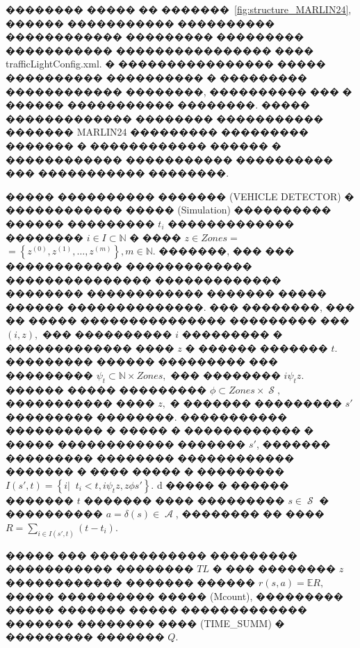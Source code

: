 \documentclass[11pt]{ubs}
\DeclareMathOperator{\state}{\mathcal{S}}
\DeclareMathOperator{\action}{\mathcal{A}}
\begin{document}
�������� ����� �� �������~\ref{fig:structure_MARLIN24}, ������ ����������� ���������� ������������ ��������� ��������� ����������� ���������������� ���� trafficLightConfig.xml. � ���������������� ����� ���������� ���������� � ��������� ������������ ��������, ���������� ��� � ������ ����������� ��������.
����� ������������� �������� ����������� ������� MARLIN24  ���������  ���������  ������� � ������������ ������  � ������������ ����������� ���������� ��� ����������� ��������.

����� ���������� ������� (VEHICLE DETECTOR) � ������������ ����� (Simulation)  ���������� ������ ��������� $t_i$ ������������� �������� $i \in I \subset \mathbb{N}$ � ���� $z\in Zones = $ $ = \left\{z^{(0)}, z^{(1)}, \dots, z^{(m)} \right\}, m \in \mathbb{N}$.
�������, ��� ��� ������������ �������������   ��������������� ������������� �������� ������������ ������� ����� ������ ��������������. ��� ��������, ��� �� ����� ��������������� ��������� ��� $(i,z),$ ���  ���������� $i$ ��������� � ������������� ���� $z$ � ������ ������� $t.$ ��������� ������ ��������� ��� ��������� $\psi_t \subset \mathbb{N} \times Zones, $ ��� ��������  $i\psi_t z.$
������ ����� ��������� $\phi \subset Zones \times \state,$ ����������� ���� $z, $ � ������� ��������� $s'$ ��������� ��������.
����������� ���������� �  ����� � ������������ � ����� ������������ ������� $s'$, ������� ��������� �������� ������������ ������� � ���� ����� � ���������
$
  I(s',t) = \left\{i|\;\; t_i < t, i \psi_t z, z \phi s' \right\}.
$
d
����� � ������ ������� $t$  ������� ���� ���������  $s\in \state$ � ���������� $a = \delta(s) \in \action$, �������� �� ���� $R= \sum\limits_{i \in I(s',t)} (t -t_i).$

����� ��� ������������ ��������� ����������� �������� $TL$  � ��� �������� $z$ ������������ ������� ������ $r(s,a) = \mathbb{E} R,$ ����� ���������� ����� (Mcount), ��������� ����� ������� ����� ������������� ������� �������� ���� (TIME\_SUMM) �  ��������� ������� $Q.$
\end{document}

